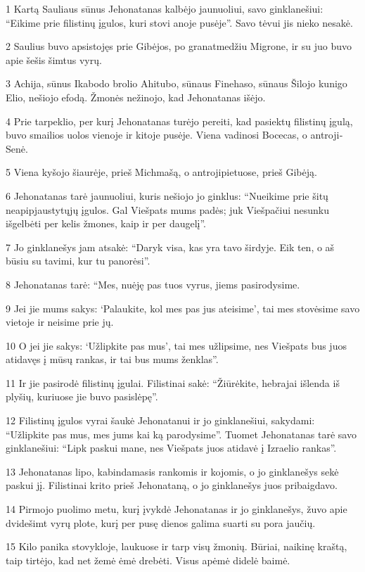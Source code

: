 \par 1 Kartą Sauliaus sūnus Jehonatanas kalbėjo jaunuoliui, savo ginklanešiui: “Eikime prie filistinų įgulos, kuri stovi anoje pusėje”. Savo tėvui jis nieko nesakė. 
\par 2 Saulius buvo apsistojęs prie Gibėjos, po granatmedžiu Migrone, ir su juo buvo apie šešis šimtus vyrų. 
\par 3 Achija, sūnus Ikabodo brolio Ahitubo, sūnaus Finehaso, sūnaus Šilojo kunigo Elio, nešiojo efodą. Žmonės nežinojo, kad Jehonatanas išėjo. 
\par 4 Prie tarpeklio, per kurį Jehonatanas turėjo pereiti, kad pasiektų filistinų įgulą, buvo smailios uolos vienoje ir kitoje pusėje. Viena vadinosi Bocecas, o antroji­Senė. 
\par 5 Viena kyšojo šiaurėje, prieš Michmašą, o antroji­pietuose, prieš Gibėją. 
\par 6 Jehonatanas tarė jaunuoliui, kuris nešiojo jo ginklus: “Nueikime prie šitų neapipjaustytųjų įgulos. Gal Viešpats mums padės; juk Viešpačiui nesunku išgelbėti per kelis žmones, kaip ir per daugelį”. 
\par 7 Jo ginklanešys jam atsakė: “Daryk visa, kas yra tavo širdyje. Eik ten, o aš būsiu su tavimi, kur tu panorėsi”. 
\par 8 Jehonatanas tarė: “Mes, nuėję pas tuos vyrus, jiems pasirodysime. 
\par 9 Jei jie mums sakys: ‘Palaukite, kol mes pas jus ateisime’, tai mes stovėsime savo vietoje ir neisime prie jų. 
\par 10 O jei jie sakys: ‘Užlipkite pas mus’, tai mes užlipsime, nes Viešpats bus juos atidavęs į mūsų rankas, ir tai bus mums ženklas”. 
\par 11 Ir jie pasirodė filistinų įgulai. Filistinai sakė: “Žiūrėkite, hebrajai išlenda iš plyšių, kuriuose jie buvo pasislėpę”. 
\par 12 Filistinų įgulos vyrai šaukė Jehonatanui ir jo ginklanešiui, sakydami: “Užlipkite pas mus, mes jums kai ką parodysime”. Tuomet Jehonatanas tarė savo ginklanešiui: “Lipk paskui mane, nes Viešpats juos atidavė į Izraelio rankas”. 
\par 13 Jehonatanas lipo, kabindamasis rankomis ir kojomis, o jo ginklanešys sekė paskui jį. Filistinai krito prieš Jehonataną, o jo ginklanešys juos pribaigdavo. 
\par 14 Pirmojo puolimo metu, kurį įvykdė Jehonatanas ir jo ginklanešys, žuvo apie dvidešimt vyrų plote, kurį per pusę dienos galima suarti su pora jaučių. 
\par 15 Kilo panika stovykloje, laukuose ir tarp visų žmonių. Būriai, naikinę kraštą, taip tirtėjo, kad net žemė ėmė drebėti. Visus apėmė didelė baimė. 
